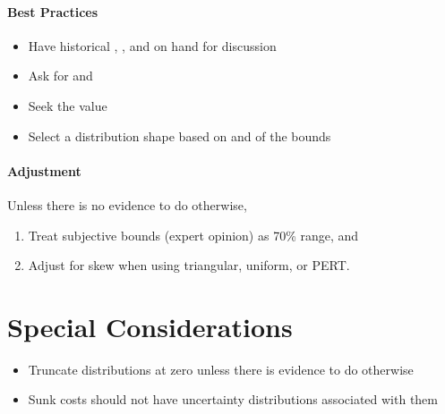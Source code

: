 \documentclass[letterpaper,10pt,english]{jupyterBook}
\begin{document}
\paragraph{Best Practices}
\label{\detokenize{PM/jcsrua:best-practices}}\begin{itemize}
\item {} 
\sphinxAtStartPar
Have historical \sphinxstylestrong{\(\min\)}, \sphinxstylestrong{\(\max\)}, and  on hand for discussion

\item {} 
\sphinxAtStartPar
Ask for  and 

\item {} 
\sphinxAtStartPar
Seek the  value

\item {} 
\sphinxAtStartPar
Select a distribution shape based on  and  of the bounds

\end{itemize}


\paragraph{Adjustment}
\label{\detokenize{PM/jcsrua:adjustment}}
\sphinxAtStartPar
Unless there is no evidence to do otherwise,
\begin{enumerate}
%
\item {} 
\sphinxAtStartPar
Treat subjective bounds (expert opinion) as 70\% range, and

\item {} 
\sphinxAtStartPar
Adjust for skew when using triangular, uniform, or PERT.

\end{enumerate}


\section{Special Considerations}
\label{\detokenize{PM/jcsrua:special-considerations}}\begin{itemize}
\item {} 
\sphinxAtStartPar
Truncate distributions at zero unless there is evidence to do otherwise

\item {} 
\sphinxAtStartPar
Sunk costs should not have uncertainty distributions associated with them

\end{itemize}
\end{document}
